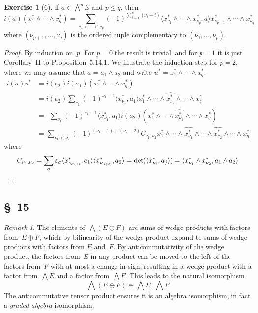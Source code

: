 \documentclass[letterpaper,12pt]{article}
\newcommand{\iso}{\cong}
\newcommand{\dsum}{\oplus}
\newcommand{\stprod}{\mathop{\widehat{\otimes}}}
\newcommand{\eprod}{\wedge}
\newcommand{\bigeprod}{\bigwedge}
\newcommand{\medeprod}{{\textstyle\bigeprod}}
\newcommand{\delete}{\widehat}
\newcommand{\sprod}[2]{\langle#1,#2\rangle}
\newcommand{\multi}[4]{#2_{#3}#1\cdots#1#2_{#4}}
\newcommand{\eprods}[3]{\multi{\eprod}{#1}{#2}{#3}}
\newcommand{\sign}[1]{\varepsilon_{#1}}
\theoremstyle{definition}
\newtheorem*{exer}{Exercise}
\theoremstyle{remark}
\newtheorem*{rmk}{Remark}
\begin{document}
\begin{exer}[6]
If \(a\in\medeprod^p E\) and \(p\le q\), then
\[i(a)(\eprods{x^*}{1}{q})=\sum_{\nu_1<\cdots<\nu_p}(-1)^{\sum_{i=1}^p(\nu_i-i)}\sprod{\eprods{x^*}{\nu_1}{\nu_p}}{a}\eprods{x^*}{\nu_{p+1}}{\nu_q}\]
where \((\nu_{p+1},\ldots,\nu_q)\) is the ordered tuple complementary to \((\nu_1,\ldots,\nu_p)\).
\end{exer}
\begin{proof}
By induction on~\(p\). For \(p=0\) the result is trivial, and for \(p=1\) it is just Corollary~II to Proposition~5.14.1. We illustrate the induction step for \(p=2\), where we may assume that \(a=a_1\eprod a_2\) and write \(u^*=\eprods{x^*}{1}{q}\):
\begin{align*}
i(a)u^*&=i(a_2)i(a_1)(\eprods{x^*}{1}{q})\\
	&=i(a_2)\sum_{\nu_1}(-1)^{\nu_1-1}\sprod{x^*_{\nu_1}}{a_1}x^*_1\eprod\cdots\eprod\delete{x^*_{\nu_1}}\eprod\cdots\eprod x^*_q\\
	&=\ \ \sum_{\nu_1}(-1)^{\nu_1-1}\sprod{x^*_{\nu_1}}{a_1}i(a_2)(x^*_1\eprod\cdots\eprod\delete{x^*_{\nu_1}}\eprod\cdots\eprod x^*_q)\\
	&=\sum_{\nu_1<\nu_2}(-1)^{(\nu_1-1)+(\nu_2-2)}C_{\nu_1,\nu_2} x^*_1\eprod\cdots\eprod\delete{x^*_{\nu_1}}\eprod\cdots\eprod\delete{x^*_{\nu_2}}\eprod\cdots\eprod x^*_q
\end{align*}
where
\[C_{\nu_1,\nu_2}=\sum_{\sigma}\sign{\sigma}\sprod{x^*_{\nu_{\sigma(1)}}}{a_1}\sprod{x^*_{\nu_{\sigma(2)}}}{a_2}=\det(\sprod{x^*_{\nu_i}}{a_j})=\sprod{x^*_{\nu_1}\eprod x^*_{\nu_2}}{a_1\eprod a_2}\qedhere\]
\end{proof}

\subsection*{\S~15}
\begin{rmk}
The elements of~\(\medeprod(E\dsum F)\) are sums of wedge products with factors from~\(E\dsum F\), which by bilinearity of the wedge product expand to sums of wedge products with factors from \(E\) and~\(F\). By anticommutativity of the wedge product, the factors from~\(E\) in any product can be moved to the left of the factors from~\(F\) with at most a change in sign, resulting in a wedge product with a factor from~\(\medeprod E\) and a factor from~\(\medeprod F\). This leads to the natural isomorphism
\[\medeprod(E\dsum F)\iso\medeprod E\stprod\medeprod F\]
The anticommutative tensor product ensures it is an algebra isomorphism, in fact a \emph{graded algebra} isomorphism.
\end{rmk}
\end{document}
